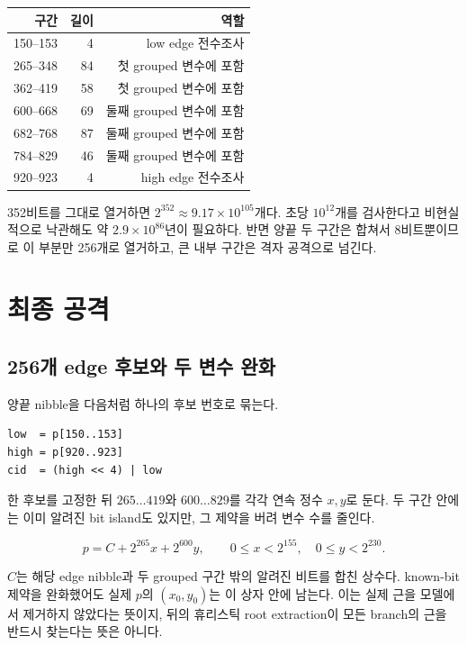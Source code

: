 \documentclass[10pt,a4paper]{article}
\begin{document}
\begin{center}
\begin{tabular}{rrr}
\toprule
구간 & 길이 & 역할 \\
\midrule
150--153 & 4 & low edge 전수조사 \\
265--348 & 84 & 첫 grouped 변수에 포함 \\
362--419 & 58 & 첫 grouped 변수에 포함 \\
600--668 & 69 & 둘째 grouped 변수에 포함 \\
682--768 & 87 & 둘째 grouped 변수에 포함 \\
784--829 & 46 & 둘째 grouped 변수에 포함 \\
920--923 & 4 & high edge 전수조사 \\
\bottomrule
\end{tabular}
\end{center}

352비트를 그대로 열거하면 \(2^{352}\approx9.17\times10^{105}\)개다.
초당 \(10^{12}\)개를 검사한다고 비현실적으로 낙관해도 약
\(2.9\times10^{86}\)년이 필요하다. 반면 양끝 두 구간은 합쳐서
8비트뿐이므로 이 부분만 256개로 열거하고, 큰 내부 구간은 격자 공격으로
넘긴다.

\section{최종 공격}

\subsection{256개 edge 후보와 두 변수 완화}

양끝 nibble을 다음처럼 하나의 후보 번호로 묶는다.

\begin{lstlisting}
low  = p[150..153]
high = p[920..923]
cid  = (high << 4) | low
\end{lstlisting}

한 후보를 고정한 뒤 \(265\ldots419\)와 \(600\ldots829\)를 각각 연속
정수 \(x,y\)로 둔다. 두 구간 안에는 이미 알려진 bit island도 있지만,
그 제약을 버려 변수 수를 줄인다.

\[
  p=C+2^{265}x+2^{600}y,\qquad
  0\le x<2^{155},\quad 0\le y<2^{230}.
\]

\(C\)는 해당 edge nibble과 두 grouped 구간 밖의 알려진 비트를 합친
상수다. known-bit 제약을 완화했어도 실제 \(p\)의 \((x_0,y_0)\)는 이
상자 안에 남는다. 이는 실제 근을 모델에서 제거하지 않았다는 뜻이지,
뒤의 휴리스틱 root extraction이 모든 branch의 근을 반드시 찾는다는
뜻은 아니다.
\end{document}
